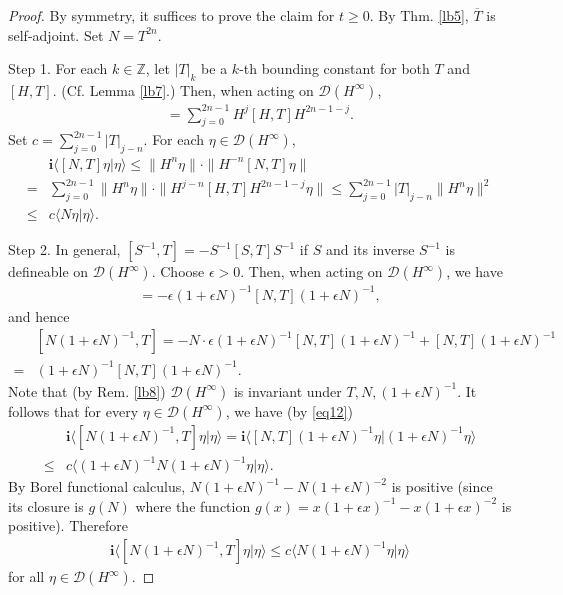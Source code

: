 \documentclass[12pt,a4paper,notitlepage]{article}
\theoremstyle{definition}
\theoremstyle{plain}
\newcommand{\ovl}{\overline}
\newcommand{\Dom}{\scr D}
\newcommand{\bk}[1]{\langle {#1}\rangle}
\newcommand{\scr}{\mathscr}
\newcommand{\im}{\mathbf{i}}
\newcommand{\Zbb}{\mathbb Z}
\numberwithin{equation}{subsection}
\begin{document}
\begin{proof}
By symmetry, it suffices to prove the claim for $t\geq 0$. By Thm. \ref{lb5}, $\ovl T$ is self-adjoint. Set $N=T^{2n}$. 

Step 1. For each $k\in\Zbb$, let $|T|_k$ be a $k$-th bounding constant for both $T$ and $[H,T]$. (Cf. Lemma \ref{lb7}.) Then, when acting on $\Dom(H^\infty)$, 
\begin{align*}
	[N,T]=\sum_{j=0}^{2n-1}H^j[H,T]H^{2n-1-j}.	
\end{align*}
Set $c=\sum_{j=0}^{2n-1}|T|_{j-n}$. For each $\eta\in\Dom(H^\infty)$,  
\begin{align}
	&\im \bk{[N,T]\eta|\eta}\leq \lVert H^n\eta \lVert\cdot \lVert H^{-n}[N,T]\eta \lVert\nonumber\\
	=&\sum_{j=0}^{2n-1}	\lVert H^n\eta \lVert\cdot\lVert H^{j-n}[H,T]H^{2n-1-j}\eta \lVert\leq \sum_{j=0}^{2n-1}	|T|_{j-n}	\lVert H^n\eta \lVert^2\nonumber\\
	\leq &c\bk{N\eta|\eta}.\label{eq12}
\end{align}


Step 2. In general,  $[S^{-1},T]=-S^{-1}[S,T]S^{-1}$ if $S$ and its inverse $S^{-1}$ is defineable on $\Dom(H^\infty)$. Choose $\epsilon>0$. Then, when acting on $\Dom(H^\infty)$, we have
\begin{align*}
	[(1+\epsilon N)^{-1},T]=-\epsilon (1+\epsilon N)^{-1}[N,T](1+\epsilon N)^{-1},
\end{align*}
and hence
\begin{align*}
	&[N(1+\epsilon N)^{-1},T]=-N\cdot \epsilon (1+\epsilon N)^{-1}[N,T](1+\epsilon N)^{-1}+[N,T](1+\epsilon N)^{-1}\\
	=&	(1+\epsilon N)^{-1}[N,T](1+\epsilon N)^{-1}.
\end{align*}
Note that (by Rem. \ref{lb8}) $\Dom(H^\infty)$ is invariant under $T,N,(1+\epsilon N)^{-1}$. It follows that for every $\eta\in\Dom(H^\infty)$, we have (by \eqref{eq12})
\begin{align*}
&\im\bk{[N(1+\epsilon N)^{-1},T]\eta|\eta}=\im\bk{[N,T](1+\epsilon N)^{-1}\eta|(1+\epsilon N)^{-1}\eta}\\
\leq &c\bk{(1+\epsilon N)^{-1}N(1+\epsilon N)^{-1}\eta|\eta}.
\end{align*}
By Borel functional calculus, $N(1+\epsilon N)^{-1}-N(1+\epsilon N)^{-2}$ is positive (since its closure is $g(N)$ where the function $g(x)=x(1+\epsilon x)^{-1}-x(1+\epsilon x)^{-2}$ is positive). Therefore
\begin{align}
\im\bk{[N(1+\epsilon N)^{-1},T]\eta|\eta}\leq 	c\bk{N(1+\epsilon N)^{-1}\eta|\eta}\label{eq13}
\end{align}
for all $\eta\in\Dom(H^\infty)$.


\end{proof}
\end{document}
